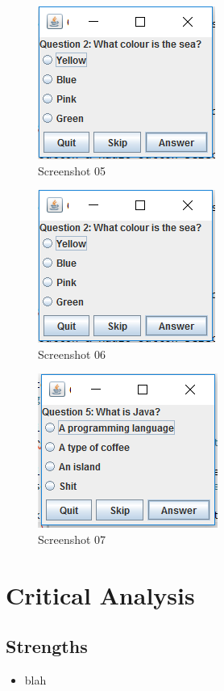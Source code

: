 \documentclass{report}
\begin{document}
    \begin{figure}
        \centering
        \includegraphics{Screenshot05}
        \caption{Screenshot 05}
        \label{fig:screenshot05}
    \end{figure}
    
    \begin{figure}
        \centering
        \includegraphics{Screenshot06}
        \caption{Screenshot 06}
        \label{fig:screenshot06}
    \end{figure}
    
    \begin{figure}
        \centering
        \includegraphics{Screenshot07}
        \caption{Screenshot 07}
        \label{fig:screenshot07}
    \end{figure}
    
    \chapter{Critical Analysis}
        \section{Strengths}
        \begin{itemize}
            \item blah
        \end{itemize}
        
\end{document}

